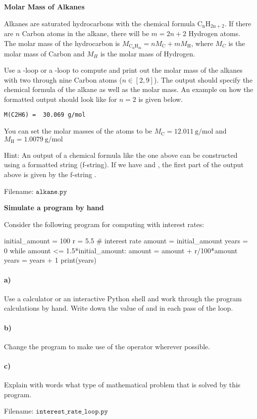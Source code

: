 \begin{Problem}{\textbf{Molar Mass of Alkanes}}

\noindent
Alkanes are saturated hydrocarbons with the chemical formula $\mathrm{C_nH_{2n+2}}$. If there are $n$ Carbon atoms in the alkane, there will be $m = 2n+2$ Hydrogen atoms. The molar mass of the hydrocarbon is $M_{\mathrm{C_n H_{m}}} = n M_{\mathrm{C}} + m M_{\mathrm{H}} $, where $M_C$ is the molar mass of Carbon and $M_H$ is the molar mass of Hydrogen.

Use a -loop or a -loop to compute and print out the molar mass of the alkanes with two through nine Carbon atoms ($n \in [2, 9]$). The output should specify the chemical formula of the alkane as well as the molar mass. An example on how the formatted output should look like for $n = 2$ is given below.
\begin{lstlisting}
M(C2H6) =  30.069 g/mol
\end{lstlisting}
You can set the molar masses of the atoms to be $M_{\mathrm{C}} = 12.011 \ \mathrm{g/mol}$ and $M_{\mathrm{H}}  = 1.0079 \ \mathrm{g/mol}$

Hint: An output of a chemical formula like the one above can be constructed using a formatted string (f-string). If we have  and
, the first part of the output above is given by the f-string .

Filename: $\texttt{alkane.py}$
\end{Problem}


\begin{Problem}{\textbf{Simulate a program by hand}}\label{interest_rate_loop}

\noindent Consider the following program for computing with interest rates:
\begin{python}
initial_amount = 100
r = 5.5 # interest rate
amount = initial_amount
years = 0
while amount <= 1.5*initial_amount:
    amount = amount + r/100*amount
    years = years + 1
print(years)
\end{python}

\paragraph{a)} Use a calculator or an interactive Python shell and work through the
program calculations by hand. Write down the value of  and 
in each pass of the loop.
\paragraph{b)} Change the program to make use of the operator \py{+=} wherever possible.
\paragraph{c)} Explain with words what type of mathematical problem that is solved by this
program.

Filename: $\texttt{interest\_rate\_loop.py}$
\end{Problem}


